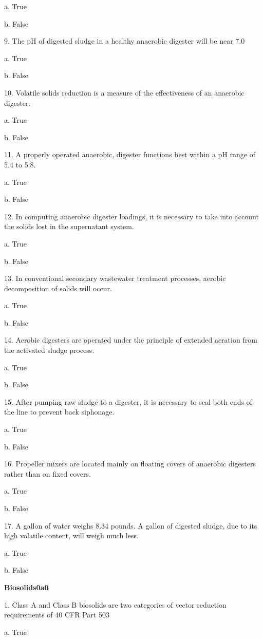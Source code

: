 \documentclass{article}
\begin{document}
a. True 

b. False 


9. The pH of digested sludge in a healthy anaerobic digester will be near 7.0 

a. True 

b. False 


10. Volatile solids reduction is a measure of the effectiveness of an anaerobic digester. 

a. True 

b. False 


11. A properly operated anaerobic, digester functions best within a pH range of 5.4 to 5.8. 

a. True 

b. False 


12. In computing anaerobic digester loadings, it is necessary to take into account the solids lost in the supernatant system. 

a. True 

b. False 


13. In conventional secondary wastewater treatment processes, aerobic decomposition of solids will occur. 

a. True 

b. False 


14. Aerobic digesters are operated under the principle of extended aeration from the activated sludge process. 

a. True 

b. False 


15. After pumping raw sludge to a digester, it is necessary to seal both ends of the line to prevent back siphonage. 

a. True 

b. False 


16. Propeller mixers are located mainly on floating covers of anaerobic digesters rather than on fixed covers. 

a. True 

b. False 


17. A gallon of water weighs 8.34 pounds.  A gallon of digested sludge, due to its high volatile content, will weigh much less. 

a. True 

b. False 


\textbf{Biosolids0a0}

1. Class A and Class B biosolids are two categories of vector reduction requirements of 40 CFR Part 503 

a. True 
\end{document}
